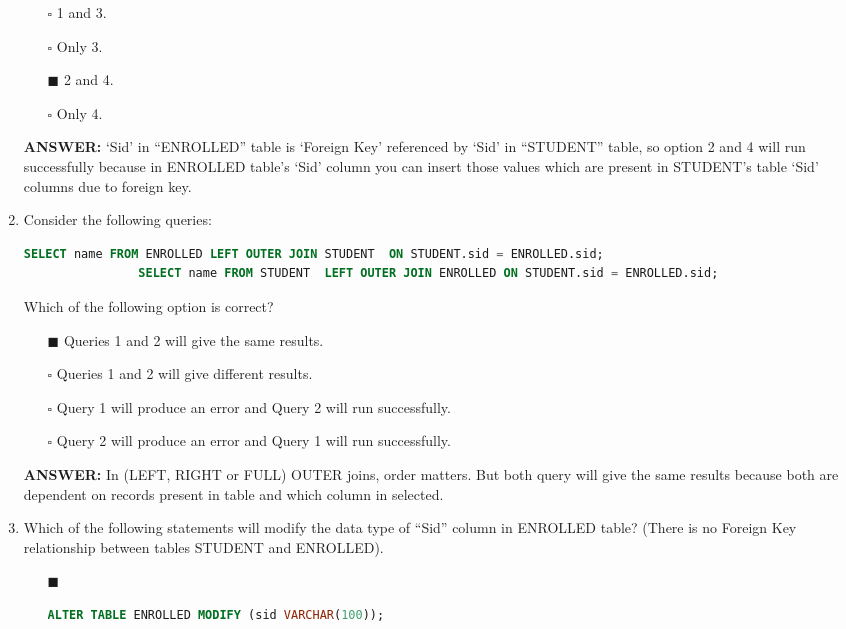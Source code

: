 \documentclass[10pt]{article}
\begin{document}
\begin{enumerate}
			\begin{enumerate}
				\item[$\square$] 1 and 3.
				\item[$\square$] Only 3.
				\item[$\blacksquare$] 2 and 4.
				\item[$\square$] Only 4.
			\end{enumerate}
			\color{red} \textbf{ANSWER:} \color{black} ‘Sid’ in “ENROLLED” table is ‘Foreign Key’ referenced by ‘Sid’ in “STUDENT” table, so option 2 and 4 will run successfully because in ENROLLED table’s ‘Sid’ column you can insert those values which are present in STUDENT’s table ‘Sid’ columns due to foreign key.
		
		\item Consider the following queries:
			\begin{lstlisting}[language=SQL,firstline=1, lastline=2] 
				SELECT name FROM ENROLLED LEFT OUTER JOIN STUDENT  ON STUDENT.sid = ENROLLED.sid;
				SELECT name FROM STUDENT  LEFT OUTER JOIN ENROLLED ON STUDENT.sid = ENROLLED.sid;
			\end{lstlisting}
			Which of the following option is correct?
			\begin{enumerate}
				\item[$\blacksquare$] Queries 1 and 2 will give the same results.
				\item[$\square$] Queries 1 and 2 will give different results.
				\item[$\square$] Query 1 will produce an error and Query 2 will run successfully.
				\item[$\square$] Query 2 will produce an error and Query 1 will run successfully.
			\end{enumerate}
			\color{red} \textbf{ANSWER:} \color{black} In (LEFT, RIGHT or FULL) OUTER joins, order matters. But both query will give the same results because both are dependent on records present in table and which column in selected.

		\newpage

		\item Which of the following statements will modify the data type of “Sid” column in ENROLLED table? (There is no Foreign Key relationship between tables STUDENT and ENROLLED).
			\begin{enumerate}
				\item[$\blacksquare$] 
					\begin{lstlisting}[language=SQL,firstline=1, lastline=1, numbers = right] 
						ALTER TABLE ENROLLED MODIFY (sid VARCHAR(100));
					\end{lstlisting}
				

\end{enumerate}
\end{enumerate}
\end{document}

